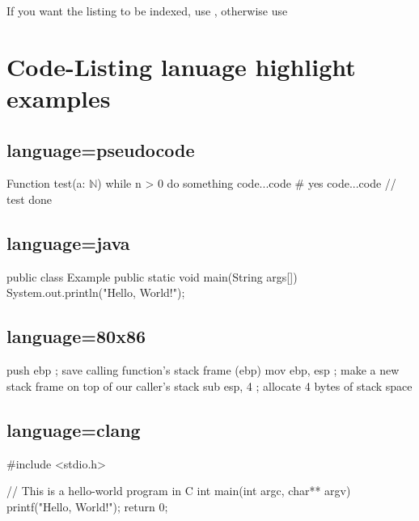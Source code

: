 \documentclass[
    narrow,
    fontstyle=light,
    babelparam=ngerman
]{elite}
\begin{document}
If you want the listing to be indexed, use , otherwise use 

\section*{Code-Listing lanuage highlight examples}

\subsection{language=pseudocode}
\label{subsec:language=pseudocode}

\begin{CodeListing}[language=pseudocode]
Function test(a: $\mathbb{N}$) {
    while n > 0 do
        something
        code...code    # yes
        code...code    // test
    done
}
\end{CodeListing}

\subsection{language=java}
\label{subsec:language=java}

\begincode
\begin{CodeListing}[language=java, caption=Beispiel-Code]
public class Example {
    public static void main(String args[]) {
        System.out.println("Hello, World!");
    }
}
\end{CodeListing}
\endcode

\subsection{language=80x86}
\label{subsec:language=80x86}

\begincode
\begin{CodeListing}[language=80x86, title=Intel 80x86 Assembler Beispiel]
push    ebp       ; save calling function's stack frame (ebp)
mov     ebp, esp  ; make a new stack frame on top of our caller's stack
sub     esp, 4    ; allocate 4 bytes of stack space
\end{CodeListing}
\endcode

\subsection{language=clang}
\label{subsec:language=clang}

\begincode
\begin{CodeListing}[language=clang, title=Example C-Code]
#include <stdio.h>

// This is a hello-world program in C
int main(int argc, char** argv)
{
    printf("Hello, World!\n");
    return 0;
}
\end{CodeListing}
\endcode
\end{document}
